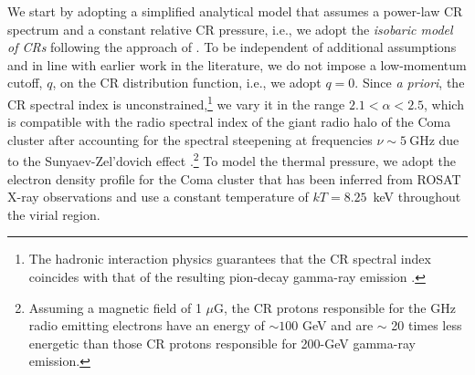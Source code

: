 \documentclass[12pt,manuscript]{aastex}
\newcommand{\rmn}{\mathrm}
\begin{document}
We start by adopting a simplified analytical model that assumes a power-law CR spectrum and a
constant relative CR pressure, i.e., we adopt the {\em isobaric model of CRs} following the approach
of \citet{article:PfrommerEnsslin:2004b}. To be independent of additional assumptions and in line
with earlier work in the literature, we do not impose a low-momentum cutoff, $q$, on the CR
distribution function, i.e., we adopt $q=0$. Since {\em a priori}, the CR spectral index is
unconstrained,\footnote{The hadronic interaction physics guarantees that the CR spectral index
coincides with that of the resulting pion-decay gamma-ray emission
\citep[see discussion in][]{article:PfrommerEnsslin:2004b}.} we vary it in the range
$2.1<\alpha<2.5$, which is compatible with the radio spectral index of the giant radio halo of the
Coma cluster after accounting for the spectral steepening at frequencies $\nu\sim5~\rmn{GHz}$ due to
the Sunyaev-Zel'dovich effect \citep{article:Ensslin:2002,
article:PfrommerEnsslin:2004b}.\footnote{Assuming a magnetic field of 1 $\mu$G, the CR protons
responsible for the GHz radio emitting electrons have an energy of $\sim100$ GeV and are $\sim$ 20
times less energetic than those CR protons responsible for 200-GeV gamma-ray emission.} To model
the thermal pressure, we adopt the electron density profile for the Coma cluster that has been
inferred from ROSAT X-ray observations \citep{article:BrielHenryBohringer:1992} and use a constant
temperature of $kT= 8.25$~keV throughout the virial region.
\end{document}
